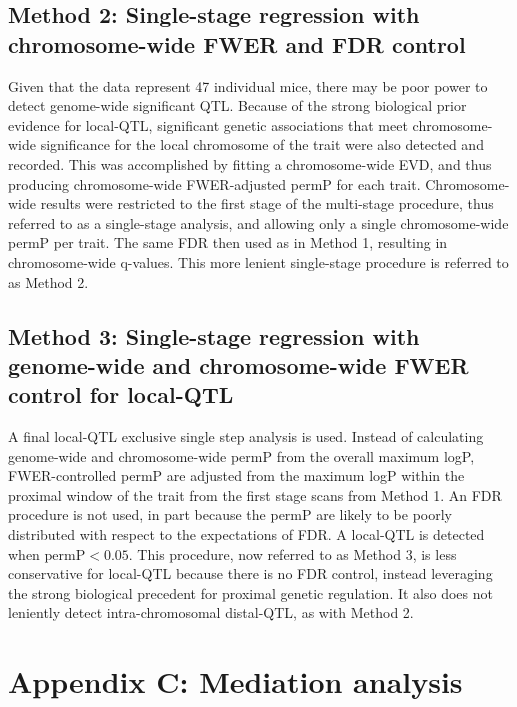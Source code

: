 \documentclass[9pt,twocolumn,twoside]{gsajnl}
\begin{document}
\subsection{Method 2: Single-stage regression with chromosome-wide FWER and FDR control}

Given that the data represent 47 individual mice, there may be poor power to detect genome-wide significant QTL. Because of the strong biological prior evidence for local-QTL, significant genetic associations that meet chromosome-wide significance for the local chromosome of the trait were also detected and recorded. This was accomplished by fitting a chromosome-wide EVD, and thus producing chromosome-wide FWER-adjusted permP for each trait. Chromosome-wide results were restricted to the first stage of the multi-stage procedure, thus referred to as a single-stage analysis, and allowing only a single chromosome-wide permP per trait. The same FDR then used as in Method 1, resulting in chromosome-wide q-values. This more lenient single-stage procedure is referred to as Method 2.

\subsection{Method 3: Single-stage regression with genome-wide and chromosome-wide FWER control for local-QTL}

A final local-QTL exclusive single step analysis is used. Instead of calculating genome-wide and chromosome-wide permP from the overall maximum logP, FWER-controlled permP are adjusted from the maximum logP within the proximal window of the trait from the first stage scans from Method 1. An FDR procedure is not used, in part because the permP are likely to be poorly distributed with respect to the expectations of FDR. A local-QTL is detected when $\text{permP} < 0.05$. This procedure, now referred to as Method 3, is less conservative for local-QTL because there is no FDR control, instead leveraging the strong biological precedent for proximal genetic regulation. It also does not leniently detect intra-chromosomal distal-QTL, as with Method 2.

\section{Appendix C: Mediation analysis}
\end{document}
